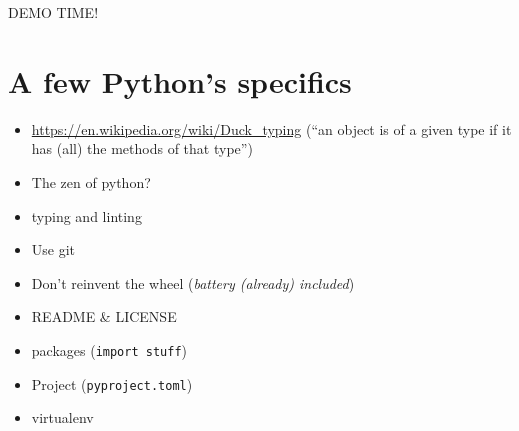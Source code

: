 \documentclass[10pt,
aspectratio=169
]{beamer}
\begin{document}
\begin{frame}
\begin{center}
	{\LARGE DEMO TIME!}
\end{center}
\end{frame}

 \section{A few Python's specifics}
 
 \begin{frame}
 	\begin{itemize}
 		 \item \url{https://en.wikipedia.org/wiki/Duck_typing} (``an object is of a given type if it has (all) the methods of that type'')
 		 \item The zen of python?
 		\item typing and linting
 		\item Use git
 		\item Don't reinvent the wheel (\textit{battery (already) included})
 		\item README \& LICENSE
 		\item packages (\texttt{import stuff})
 		\item Project (\texttt{pyproject.toml})
 		\item virtualenv
 	\end{itemize}
 \end{frame}
\end{document}
